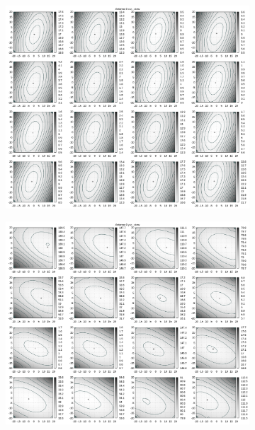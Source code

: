 \begin{figure}[!ht]
     \centering
     \begin{subfigure}[t]{0.4\textwidth}
             \centering
             \includegraphics[width=\textwidth]{img/fitness/xz_a0.png}
     \end{subfigure}
     \qquad
     \begin{subfigure}[t]{0.4\textwidth}
			\centering
			\includegraphics[width=\textwidth]{img/fitness/yz_a0.png}

\end{subfigure}
\end{figure}
